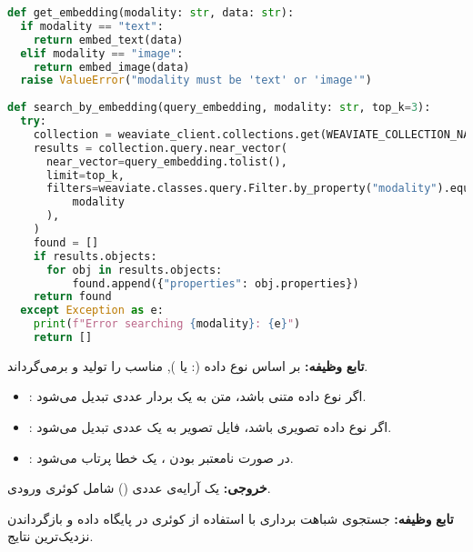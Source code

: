 \documentclass{article}
\begin{document}
\begin{latin}
\begin{lstlisting}[language=Python]
def get_embedding(modality: str, data: str):
  if modality == "text":
    return embed_text(data)
  elif modality == "image":
    return embed_image(data)
  raise ValueError("modality must be 'text' or 'image'")
 
def search_by_embedding(query_embedding, modality: str, top_k=3):
  try:
    collection = weaviate_client.collections.get(WEAVIATE_COLLECTION_NAME)
    results = collection.query.near_vector(
      near_vector=query_embedding.tolist(),
      limit=top_k,
      filters=weaviate.classes.query.Filter.by_property("modality").equal(
          modality
      ),
    )
    found = []
    if results.objects:
      for obj in results.objects:
          found.append({"properties": obj.properties})
    return found
  except Exception as e:
    print(f"Error searching {modality}: {e}")
    return []
\end{lstlisting}
\end{latin}

\textbf{تابع }
\textbf{وظیفه:} بر اساس نوع داده (:  یا ),  مناسب را تولید و برمی‌گرداند.

\begin{itemize}
    \item {}: اگر نوع داده متنی باشد، متن به یک بردار عددی تبدیل می‌شود.
    \item {}: اگر نوع داده تصویری باشد،  فایل تصویر به یک  عددی تبدیل می‌شود.
    \item {}: در صورت نامعتبر بودن ، یک خطا پرتاب می‌شود.
\end{itemize}
\textbf{خروجی:} یک آرایه‌ی عددی () شامل  کوئری ورودی.

\textbf{تابع }
\textbf{وظیفه:} جستجوی شباهت برداری با استفاده از  کوئری در پایگاه داده  و بازگرداندن نزدیک‌ترین نتایج.
\end{document}
